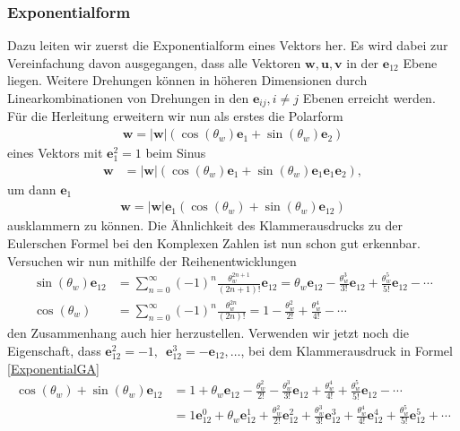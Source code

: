\subsubsection{Exponentialform}
Dazu leiten wir zuerst die Exponentialform eines Vektors her. Es wird dabei zur Vereinfachung davon ausgegangen, dass alle Vektoren $\mathbf{w}, \mathbf{u}, \mathbf{v}$ in der $\mathbf{e}_{12}$ Ebene liegen. Weitere Drehungen können in höheren Dimensionen durch Linearkombinationen von Drehungen in den $\mathbf{e}_{ij}, i\not=j$ Ebenen erreicht werden. Für die Herleitung erweitern wir nun als erstes die Polarform
\begin{align}
	\mathbf{w} = |\mathbf{w}| \left(\cos(\theta_w) \mathbf{e}_1 + \sin(\theta_w) \mathbf{e}_2\right)
\end{align}
eines Vektors mit $\mathbf{e}_1^2 = 1$ beim Sinus
\begin{align}\label{e1ausklammern}
	\mathbf{w} &= |\mathbf{w}| \left(\cos(\theta_w) \mathbf{e}_1 + \sin(\theta_w) \mathbf{e}_1\mathbf{e}_1\mathbf{e}_2\right), 
\end{align}
um dann $\mathbf{e}_1$
\begin{align}
	\mathbf{w} = |\mathbf{w}|\mathbf{e}_1\left(\cos(\theta_w)+ \sin(\theta_w) \mathbf{e}_{12}\right) \label{ExponentialGA}
\end{align}
ausklammern zu können. Die Ähnlichkeit des Klammerausdrucks zu der Eulerschen Formel bei den Komplexen Zahlen ist nun schon gut erkennbar. Versuchen wir nun mithilfe der Reihenentwicklungen
\begin{align}
	\sin(\theta_w)\mathbf{e}_{12}&=\sum _{n=0}^{\infty }(-1)^{n}{\frac {\theta_w^{2n+1}}{(2n+1)!}}\mathbf{e}_{12} =\theta_w\mathbf{e}_{12}-{\frac {\theta_w^{3}}{3!}}\mathbf{e}_{12}+{\frac {\theta_w^{5}}{5!}}\mathbf{e}_{12}-\cdots \\
	\cos(\theta_w)&=\sum _{n=0}^{\infty }(-1)^{n}{\frac {\theta_w^{2n}}{(2n)!}} =1-{\frac {\theta_w^{2}}{2!}}+{\frac {\theta_w^{4}}{4!}}-\cdots
\end{align}
den Zusammenhang auch hier herzustellen. Verwenden wir jetzt noch die Eigenschaft, dass $\mathbf{e}_{12}^2=-1, \enspace\mathbf{e}_{12}^3=-\mathbf{e}_{12}, \dots$, bei dem Klammerausdruck in Formel \eqref{ExponentialGA}
\begin{align}
	\cos(\theta_w)+ \sin(\theta_w) \mathbf{e}_{12} &= 1+\theta_w\mathbf{e}_{12}-{\frac {\theta_w^{2}}{2!}}-{\frac {\theta_w^{3}}{3!}}\mathbf{e}_{12}+{\frac {\theta_w^{4}}{4!}}+{\frac {\theta_w^{5}}{5!}}\mathbf{e}_{12}-\cdots\\
	&= 1 \mathbf{e}_{12}^0+\theta_w\mathbf{e}_{12}^1+{\frac {\theta_w^{2}}{2!}}\mathbf{e}_{12}^2+{\frac {\theta_w^{3}}{3!}}\mathbf{e}_{12}^3+{\frac {\theta_w^{4}}{4!}}\mathbf{e}_{12}^4+{\frac {\theta_w^{5}}{5!}}\mathbf{e}_{12}^5+\cdots
	\label{ExponentialGA2}
\end{align}

